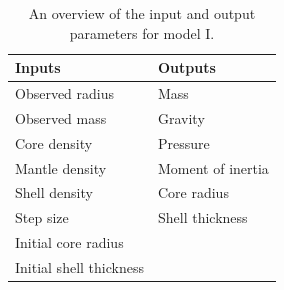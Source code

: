 \documentclass[twocolumn]{article}
\begin{document}
\begin{table}[h]
	\caption{An overview of the input and output parameters for model I.}
	\label{tab:inputoutput1}
	\centering
		\begin{tabular}{ll}
			\textbf{Inputs} & \textbf{Outputs}  \\ \hline
			Observed radius & Mass              \\
			Observed mass   & Gravity           \\
			Core density    & Pressure          \\
			Mantle density  & Moment of inertia \\
			Shell density   & Core radius       \\
			Step size       & Shell thickness  \\
			Initial core radius &   \\
			Initial shell thickness
		\end{tabular}%
\end{table}
\end{document}
